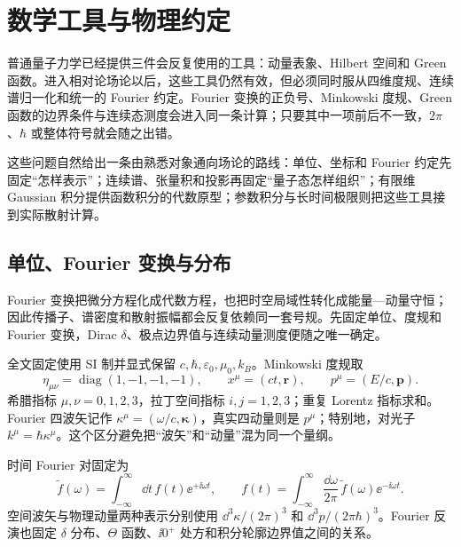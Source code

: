 \chapter{数学工具与物理约定}\label{chap:math-foundations}

普通量子力学已经提供三件会反复使用的工具：动量表象、Hilbert 空间和 Green 函数。进入相对论场论以后，这些工具仍然有效，但必须同时服从四维度规、连续谱归一化和统一的 Fourier 约定。Fourier 变换的正负号、Minkowski 度规、Green 函数的边界条件与连续态测度会进入同一条计算；只要其中一项前后不一致，$2\pi$、$\hbar$ 或整体符号就会随之出错。

这些问题自然给出一条由熟悉对象通向场论的路线：单位、坐标和 Fourier 约定先固定“怎样表示”；连续谱、张量积和投影再固定“量子态怎样组织”；有限维 Gaussian 积分提供函数积分的代数原型；参数积分与长时间极限则把这些工具接到实际散射计算。

\section{单位、Fourier 变换与分布}

Fourier 变换把微分方程化成代数方程，也把时空局域性转化成能量—动量守恒；因此传播子、谱密度和散射振幅都会反复依赖同一套号规。先固定单位、度规和 Fourier 变换，Dirac $\delta$、极点边界值与连续动量测度便随之唯一确定。

全文固定使用 SI 制并显式保留 $c,\hbar,\varepsilon_0,\mu_0,k_B$。Minkowski 度规取
\begin{equation}
\eta_{\mu\nu}=\operatorname{diag}(1,-1,-1,-1),
\qquad x^\mu=(ct,\mathbf r),
\qquad p^\mu=(E/c,\mathbf p).
\label{eq:global-metric-convention}
\end{equation}
希腊指标 $\mu,\nu=0,1,2,3$，拉丁空间指标 $i,j=1,2,3$；重复 Lorentz 指标求和。Fourier 四波矢记作 $\kappa^\mu=(\omega/c,\boldsymbol\kappa)$，真实四动量则是 $p^\mu$；特别地，对光子 $k^\mu=\hbar\kappa^\mu$。这个区分避免把“波矢”和“动量”混为同一个量纲。

时间 Fourier 对固定为
\begin{equation}
\widetilde f(\omega)=\int_{-\infty}^{\infty}\dd t\,f(t)\ee^{+\ii\omega t},
\qquad
f(t)=\int_{-\infty}^{\infty}\frac{\dd\omega}{2\pi}\,\widetilde f(\omega)\ee^{-\ii\omega t}.
\label{eq:global-time-fourier}
\end{equation}
空间波矢与物理动量两种表示分别使用 $\dd^3 \kappa/(2\pi)^3$ 和 $\dd^3 p/(2\pi\hbar)^3$。Fourier 反演也固定 $\delta$ 分布、$\Theta$ 函数、$\ii0^+$ 处方和积分轮廓边界值之间的关系。





